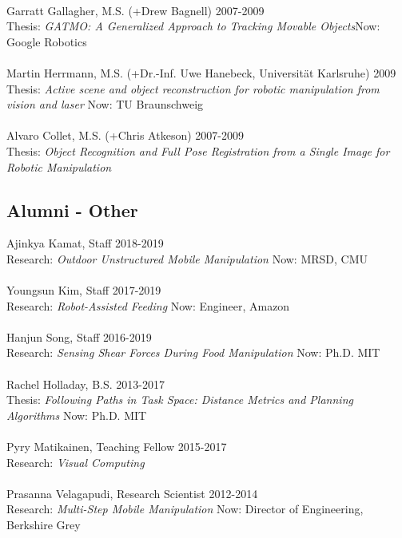 \\
Garratt Gallagher, M.S. (+Drew Bagnell) \hfill 2007-2009\\ 
Thesis: \textit{GATMO: A Generalized Approach to Tracking Movable Objects}\hfill Now: Google Robotics\\
\\
Martin Herrmann, M.S. (+Dr.-Inf. Uwe Hanebeck, Universit\"at Karlsruhe) \hfill 2009\\
Thesis: \textit{Active scene and object reconstruction for robotic manipulation from vision and laser} \hfill Now: TU Braunschweig\\
\\
Alvaro Collet, M.S. (+Chris Atkeson) \hfill 2007-2009\\
Thesis: \textit{Object Recognition and Full Pose Registration from a Single Image for Robotic Manipulation}\\
\subsection{Alumni - Other}
\noindent
Ajinkya Kamat, Staff \hfill 2018-2019\\
Research: \textit{Outdoor Unstructured Mobile Manipulation} \hfill Now: MRSD, CMU\\
\\
Youngsun Kim, Staff \hfill 2017-2019\\
Research: \textit{Robot-Assisted Feeding} \hfill Now: Engineer, Amazon\\
\\
Hanjun Song, Staff \hfill 2016-2019\\
Research: \textit{Sensing Shear Forces During Food Manipulation} \hfill Now: Ph.D. MIT\\
\\
Rachel Holladay, B.S. \hfill 2013-2017\\
Thesis: \textit{Following Paths in Task Space: Distance Metrics and Planning Algorithms} \hfill Now: Ph.D. MIT\\
\\
Pyry Matikainen, Teaching Fellow \hfill 2015-2017 
\\Research: \textit{Visual Computing} \\
\\
Prasanna Velagapudi, Research Scientist \hfill 2012-2014\\
Research: \textit{Multi-Step Mobile Manipulation }\hfill Now: Director of Engineering, Berkshire Grey\\
\\

